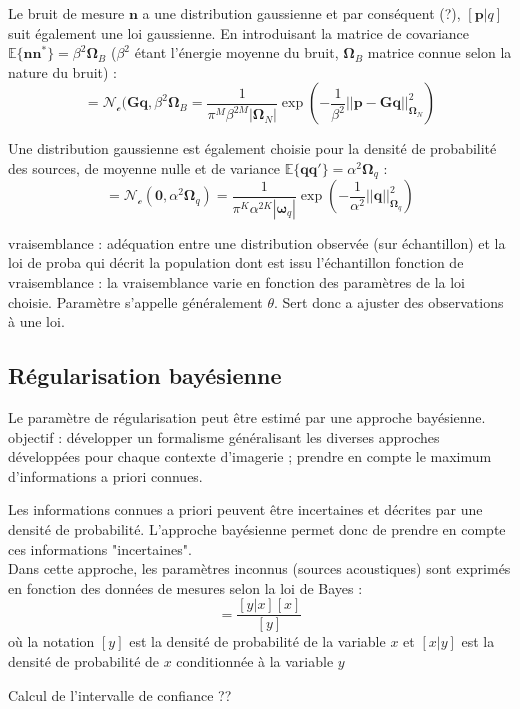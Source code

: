 Le bruit de mesure $\bm{n}$  a une distribution gaussienne et par conséquent (?), $[\bm{p}|q]$ suit également une loi gaussienne. En introduisant la matrice de covariance $\mathbb{E}\{\bm{n}\bm{n}^*\}=\beta^{2}\bm{\Omega}_B$ ($\beta^2$ étant l'énergie moyenne du bruit, $\bm{\Omega}_B$ matrice connue selon la nature du bruit) : 
\begin{equation}
[\bm{p}|q] =\mathcal{N_c}(\bm{G}\bm{q},\beta^2\bm{\Omega}_B = \frac{   1   }{ \pi^M \beta^{2M} |\bm{\Omega}_N| } \exp \left( -\frac{1}{\beta^2} ||   \bm{p}  -  \bm{Gq}  ||^2_{\bm{\Omega}_N} \right)
\end{equation}

Une distribution gaussienne est également choisie pour la densité de probabilité des sources, de moyenne nulle et de variance $\mathbb{E}\{\bm{q}\bm{q}'\}=\alpha^2 \bm{\Omega}_q$ : 
\begin{equation}
	[\bm{q}] = \mathcal{N_c}(\bm{0}, \alpha^2\bm{\Omega}_q) = \frac{  1  }{  \pi^K\alpha^{2K} |\bm{\omega}_q|} \exp \left( -\frac{1}{\alpha^2}   ||\bm{q}||^2_{\bm{\Omega}_q} \right)
\end{equation}

vraisemblance : adéquation entre une distribution observée (sur échantillon) et la loi de proba qui décrit la population dont est issu l'échantillon 
fonction de vraisemblance : la vraisemblance varie  en fonction des paramètres de la loi choisie. Paramètre s'appelle généralement $\theta$. Sert donc a ajuster des observations à une loi.




\subsection{Régularisation bayésienne}

Le paramètre de régularisation peut être estimé par une approche bayésienne. 
objectif : développer un formalisme généralisant les diverses approches développées pour chaque contexte d'imagerie ; prendre en compte le maximum d'informations a priori connues.

Les informations connues a priori peuvent être incertaines et décrites par une densité de probabilité. L'approche bayésienne permet donc de prendre en compte ces informations "incertaines".\\
Dans cette approche, les paramètres inconnus (sources acoustiques) sont exprimés en fonction des données de mesures selon la loi de Bayes : 
\begin{equation}
[x|y] = \frac{[y|x][x]}{[y]}
\end{equation}
où la notation $[y]$ est la densité de probabilité de la variable $x$ et $[x|y]$ est la densité de probabilité de $x$ conditionnée à la variable $y$





Calcul de l'intervalle de confiance ??
	
